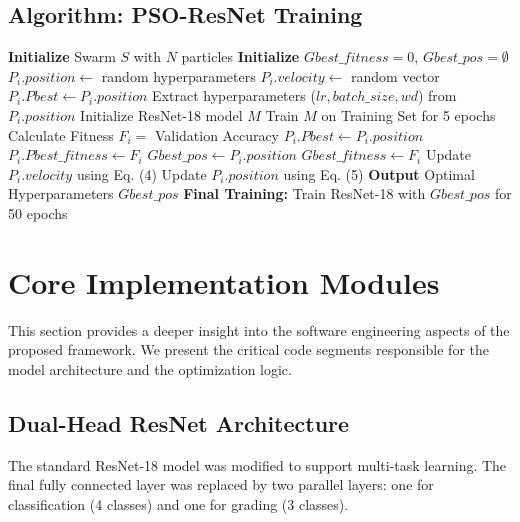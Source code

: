 \documentclass[11pt, a4paper]{article}
\begin{document}
\subsection{Algorithm: PSO-ResNet Training}
\begin{algorithm}
\caption{PSO-Optimized ResNet Training}
\begin{algorithmic}[1]
\STATE \textbf{Initialize} Swarm $S$ with $N$ particles
\STATE \textbf{Initialize} $Gbest\_fitness = 0$, $Gbest\_pos = \emptyset$
    \STATE $P_i.position \leftarrow$ random hyperparameters
    \STATE $P_i.velocity \leftarrow$ random vector
    \STATE $P_i.Pbest \leftarrow P_i.position$
\ENDFOR
{}
        \STATE Extract hyperparameters ($lr, batch\_size, wd$) from $P_i.position$
        \STATE Initialize ResNet-18 model $M$
        \STATE Train $M$ on Training Set for 5 epochs
        \STATE Calculate Fitness $F_i = $ Validation Accuracy
            \STATE $P_i.Pbest \leftarrow P_i.position$
            \STATE $P_i.Pbest\_fitness \leftarrow F_i$
        \ENDIF
            \STATE $Gbest\_pos \leftarrow P_i.position$
            \STATE $Gbest\_fitness \leftarrow F_i$
        \ENDIF
    \ENDFOR
        \STATE Update $P_i.velocity$ using Eq. (4)
        \STATE Update $P_i.position$ using Eq. (5)
    \ENDFOR
\ENDWHILE
\STATE \textbf{Output} Optimal Hyperparameters $Gbest\_pos$
\STATE \textbf{Final Training:} Train ResNet-18 with $Gbest\_pos$ for 50 epochs
\end{algorithmic}
\end{algorithm}

\section{Core Implementation Modules}

This section provides a deeper insight into the software engineering aspects of the proposed framework. We present the critical code segments responsible for the model architecture and the optimization logic.

\subsection{Dual-Head ResNet Architecture}
The standard ResNet-18 model was modified to support multi-task learning. The final fully connected layer was replaced by two parallel layers: one for classification (4 classes) and one for grading (3 classes).
\end{document}
